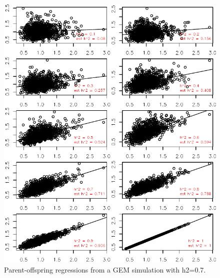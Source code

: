 \documentclass[12pt,reqno,final,pdftex]{amsart}\usepackage[]{graphicx}\usepackage[]{color}
\newenvironment{knitrout}{}{} %
\theoremstyle{plain}
\numberwithin{equation}{part}
\begin{document}
\begin{knitrout}\scriptsize
{}\color{fgcolor}\begin{figure}

\includegraphics[width=\linewidth]{figure/unnamed-chunk-6-1} \hfill{}

\caption[Parent-offspring regressions from a GEM simulation with h2=0.7]{Parent-offspring regressions from a GEM simulation with h2=0.7.}\label{fig:unnamed-chunk-6}
\end{figure}


\end{knitrout}
\end{document}
